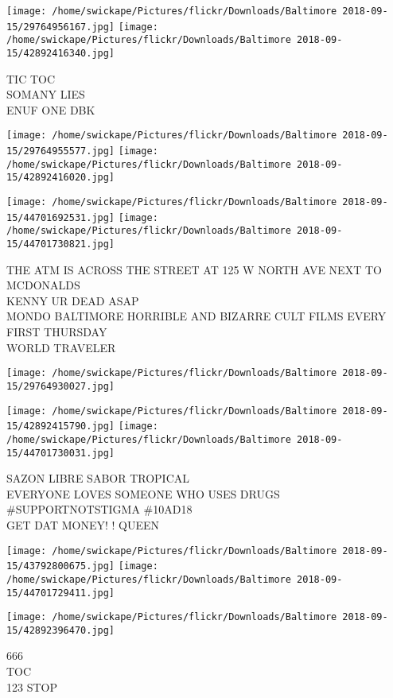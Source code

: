 \documentclass[10pt,letterpaper]{article}
\begin{document}
\vspace{0.25in}
\texttt{[image: /home/swickape/Pictures/flickr/Downloads/Baltimore 2018-09-15/29764956167.jpg]}
\texttt{[image: /home/swickape/Pictures/flickr/Downloads/Baltimore 2018-09-15/42892416340.jpg]}

TIC TOC\\
SOMANY LIES\\
ENUF ONE DBK
\pagebreak

\texttt{[image: /home/swickape/Pictures/flickr/Downloads/Baltimore 2018-09-15/29764955577.jpg]}
\texttt{[image: /home/swickape/Pictures/flickr/Downloads/Baltimore 2018-09-15/42892416020.jpg]}

\texttt{[image: /home/swickape/Pictures/flickr/Downloads/Baltimore 2018-09-15/44701692531.jpg]}
\texttt{[image: /home/swickape/Pictures/flickr/Downloads/Baltimore 2018-09-15/44701730821.jpg]}

THE ATM IS ACROSS THE STREET AT 125 W NORTH AVE NEXT TO MCDONALDS\\
KENNY UR DEAD ASAP\\
MONDO BALTIMORE HORRIBLE AND BIZARRE CULT FILMS EVERY FIRST THURSDAY\\
WORLD TRAVELER
\pagebreak

\texttt{[image: /home/swickape/Pictures/flickr/Downloads/Baltimore 2018-09-15/29764930027.jpg]}

\vspace{0.25in}
\texttt{[image: /home/swickape/Pictures/flickr/Downloads/Baltimore 2018-09-15/42892415790.jpg]}
\texttt{[image: /home/swickape/Pictures/flickr/Downloads/Baltimore 2018-09-15/44701730031.jpg]}

SAZON LIBRE SABOR TROPICAL\\
EVERYONE LOVES SOMEONE WHO USES DRUGS \#SUPPORTNOTSTIGMA \#10AD18\\
GET DAT MONEY! ! QUEEN
\pagebreak

\texttt{[image: /home/swickape/Pictures/flickr/Downloads/Baltimore 2018-09-15/43792800675.jpg]}
\texttt{[image: /home/swickape/Pictures/flickr/Downloads/Baltimore 2018-09-15/44701729411.jpg]}

\vspace{0.25in}
\texttt{[image: /home/swickape/Pictures/flickr/Downloads/Baltimore 2018-09-15/42892396470.jpg]}

666\\
TOC\\
123 STOP
\pagebreak
\end{document}
